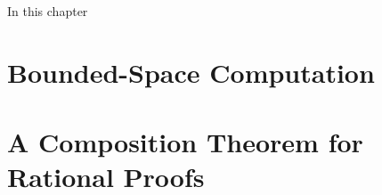 In this chapter \XXX

\section{Bounded-Space Computation}


\section{A Composition Theorem for Rational Proofs}
